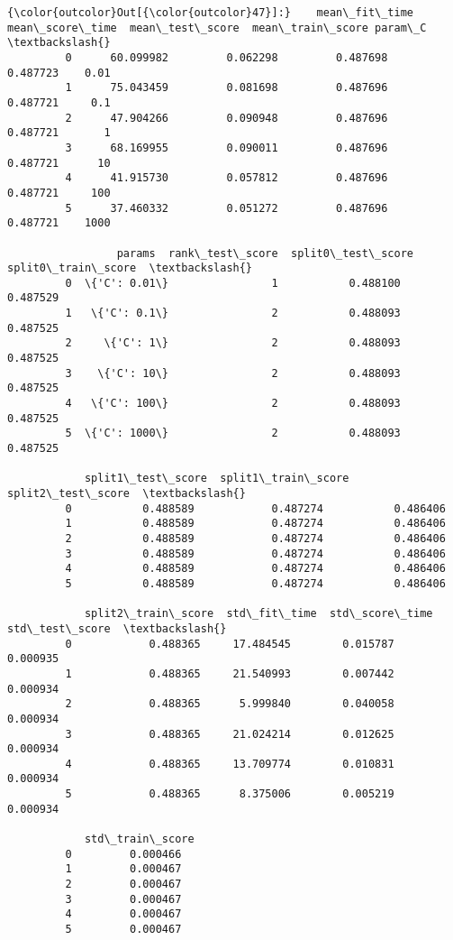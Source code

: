\documentclass[11pt]{article}
\begin{document}
            \begin{Verbatim}[commandchars=\\\{\}]
{\color{outcolor}Out[{\color{outcolor}47}]:}    mean\_fit\_time  mean\_score\_time  mean\_test\_score  mean\_train\_score param\_C  \textbackslash{}
         0      60.099982         0.062298         0.487698          0.487723    0.01   
         1      75.043459         0.081698         0.487696          0.487721     0.1   
         2      47.904266         0.090948         0.487696          0.487721       1   
         3      68.169955         0.090011         0.487696          0.487721      10   
         4      41.915730         0.057812         0.487696          0.487721     100   
         5      37.460332         0.051272         0.487696          0.487721    1000   
         
                 params  rank\_test\_score  split0\_test\_score  split0\_train\_score  \textbackslash{}
         0  \{'C': 0.01\}                1           0.488100            0.487529   
         1   \{'C': 0.1\}                2           0.488093            0.487525   
         2     \{'C': 1\}                2           0.488093            0.487525   
         3    \{'C': 10\}                2           0.488093            0.487525   
         4   \{'C': 100\}                2           0.488093            0.487525   
         5  \{'C': 1000\}                2           0.488093            0.487525   
         
            split1\_test\_score  split1\_train\_score  split2\_test\_score  \textbackslash{}
         0           0.488589            0.487274           0.486406   
         1           0.488589            0.487274           0.486406   
         2           0.488589            0.487274           0.486406   
         3           0.488589            0.487274           0.486406   
         4           0.488589            0.487274           0.486406   
         5           0.488589            0.487274           0.486406   
         
            split2\_train\_score  std\_fit\_time  std\_score\_time  std\_test\_score  \textbackslash{}
         0            0.488365     17.484545        0.015787        0.000935   
         1            0.488365     21.540993        0.007442        0.000934   
         2            0.488365      5.999840        0.040058        0.000934   
         3            0.488365     21.024214        0.012625        0.000934   
         4            0.488365     13.709774        0.010831        0.000934   
         5            0.488365      8.375006        0.005219        0.000934   
         
            std\_train\_score  
         0         0.000466  
         1         0.000467  
         2         0.000467  
         3         0.000467  
         4         0.000467  
         5         0.000467  
\end{Verbatim}
        
\end{document}
